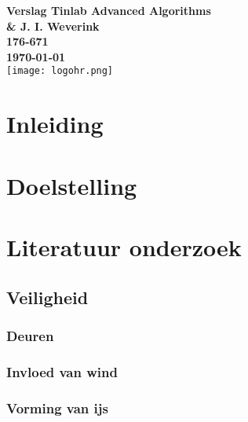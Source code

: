 \documentclass{article}
\begin{document}
\graphicspath{{../Images/}}
\sffamily
\begin{titlepage}
  \centering
    \vfill
    {\bfseries\Huge
      Verslag Tinlab Advanced Algorithms \\
        \vskip2cm
      }
      {\bfseries\Large
        \& J. I. Weverink\\
      }
      {
        \bfseries\normalsize
        176-671\\
        \vskip1cm
        \today\\
    }
    \vfill
    \texttt{[image: logohr.png]} %
    \vfill
    \vfill
\end{titlepage}
\newpage
\tableofcontents

\clearpage %
\section{Inleiding}

\clearpage %
\section{Doelstelling} 

\clearpage %
\section{Literatuur onderzoek} %

\subsection{Veiligheid}

\subsubsection{Deuren}

\subsubsection{Invloed van wind}

\subsubsection{Vorming van ijs}




\begin{thebibliography}{9}
\end{thebibliography}
\end{document}
